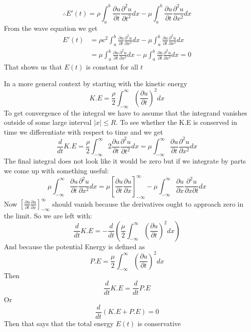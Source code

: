 \documentclass[]{article}
\begin{document}
\[
\therefore E'(t) = \rho \int_{a}^{b} \frac{\partial u}{\partial t}\frac{\partial^2 u}{\partial t^2} dx -\mu \int_{a}^{b} \frac{\partial u}{\partial t}\frac{\partial^2 u}{\partial x^2} dx    
\]
From the wave equation we get 
\begin{align*}
    E'(t) &= \rho c^2 \int_{a}^{b} \frac{\partial u}{\partial t}\frac{\partial^2 u}{\partial x^2} dx -\mu \int_{a}^{b} \frac{\partial u}{\partial t}\frac{\partial^2 u}{\partial x^2} dx    
    \\
    &= \mu \int_{a}^{b} \frac{\partial u}{\partial t}\frac{\partial^2 u}{\partial x^2} dx -\mu \int_{a}^{b} \frac{\partial u}{\partial t}\frac{\partial^2 u}{\partial x^2} dx = 0
\end{align*}
That shows us that $E(t)$ is constant for all $t$
\par
In a more general context by starting with the kinetic energy
\[
K.E = \frac{\rho}{2} \int_{-\infty}^{\infty} {\left(\frac{\partial u}{\partial t}\right)}^2 dx    
\]
To get convergence of the integral we have to assume that the integrand vanishes
outside of some large interval $|x| \leq R$.
To see whether the K.E is conserved in time
we differentiate with respect to time and we get
\[
\frac{d}{dt}K.E = \frac{\rho}{2} \int_{-\infty}^{\infty} 2\frac{\partial u}{\partial t}\frac{\partial^2 u}{\partial t^2} dx = \mu \int_{-\infty}^{\infty} \frac{\partial u}{\partial t}\frac{\partial^2 u}{\partial x^2} dx
\]
The final integral does not look like it would be zero but if we integrate by
parts we come up with something useful:
\[
    \mu \int_{-\infty}^{\infty} \frac{\partial u}{\partial t}\frac{\partial^2 u}{\partial x^2} dx = \mu \left[\frac{\partial u}{\partial t}\frac{\partial u}{\partial x}\right]_{-\infty}^{\infty} - \mu \int_{-\infty}^{\infty} \frac{\partial u}{\partial x}\frac{\partial^2 u}{\partial x \partial t} dx
\]
Now $\displaystyle \left[\frac{\partial u}{\partial t}\frac{\partial u}{\partial x}\right]_{-\infty}^{\infty} $ should vanish because the derivatives ought to approach zero in the limit. So we are left with:
\[
\frac{d}{dt}K.E = -\frac{d}{dt}\left(\frac{\mu}{2} \int_{-\infty}^{\infty} {\left(\frac{\partial u}{\partial t}\right)}^2 dx\right)
\]
And because the potential Energy is defined as 
\[
P.E = \frac{\mu}{2} \int_{-\infty}^{\infty} {\left(\frac{\partial u}{\partial t}\right)}^2 dx
\]
Then 
\[
   \frac{d}{dt}K.E = \frac{d}{dt}P.E 
\]
Or 
\[
\frac{d}{dt} \left(K.E + P.E \right) = 0    
\]
Then that says that the total energy $E(t)$ is conservative
\newpage
\end{document}
